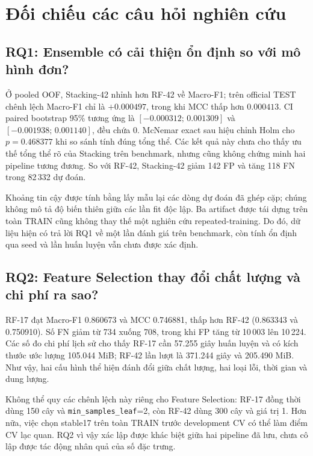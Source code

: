 \section{Đối chiếu các câu hỏi nghiên cứu}
\label{sec:revision-rq-all}

\subsection{RQ1: Ensemble có cải thiện ổn định so với mô hình đơn?}
\label{sec:revision-rq1}
Ở pooled OOF, Stacking-42 nhỉnh hơn RF-42 về Macro-F1; trên official TEST chênh lệch Macro-F1 chỉ là $+0.000497$, trong khi MCC thấp hơn $0.000413$. CI paired bootstrap 95\% tương ứng là $[-0.000312;\,0.001309]$ và $[-0.001938;\,0.001140]$, đều chứa 0. McNemar exact sau hiệu chỉnh Holm cho $p=0.468377$ khi so sánh tính đúng tổng thể. Các kết quả này chưa cho thấy ưu thế tổng thể rõ của Stacking trên benchmark, nhưng cũng không chứng minh hai pipeline tương đương. So với RF-42, Stacking-42 giảm 142 FP và tăng 118 FN trong 82\,332 dự đoán.

Khoảng tin cậy được tính bằng lấy mẫu lại các dòng dự đoán đã ghép cặp; chúng không mô tả độ biến thiên giữa các lần fit độc lập. Ba artifact được tái dựng trên toàn TRAIN cũng không thay thế một nghiên cứu repeated-training. Do đó, dữ liệu hiện có trả lời RQ1 về một lần đánh giá trên benchmark, còn tính ổn định qua seed và lần huấn luyện vẫn chưa được xác định.

\subsection{RQ2: Feature Selection thay đổi chất lượng và chi phí ra sao?}
\label{sec:revision-rq2}
RF-17 đạt Macro-F1 0.860673 và MCC 0.746881, thấp hơn RF-42 (0.863343 và 0.750910). Số FN giảm từ 734 xuống 708, trong khi FP tăng từ 10\,003 lên 10\,224. Các số đo chi phí lịch sử cho thấy RF-17 cần 57.255 giây huấn luyện và có kích thước ước lượng 105.044 MiB; RF-42 lần lượt là 371.244 giây và 205.490 MiB. Như vậy, hai cấu hình thể hiện đánh đổi giữa chất lượng, hai loại lỗi, thời gian và dung lượng.

Không thể quy các chênh lệch này riêng cho Feature Selection: RF-17 đồng thời dùng 150 cây và \texttt{min\_samples\_leaf}=2, còn RF-42 dùng 300 cây và giá trị 1. Hơn nữa, việc chọn stable17 trên toàn TRAIN trước development CV có thể làm điểm CV lạc quan. RQ2 vì vậy xác lập được khác biệt giữa hai pipeline đã lưu, chưa cô lập được tác động nhân quả của số đặc trưng.


